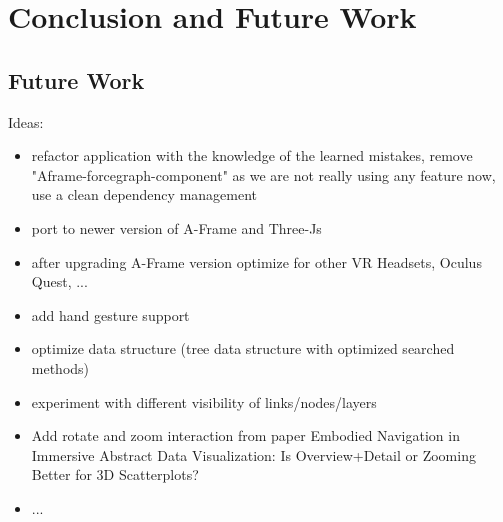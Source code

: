 \chapter{Conclusion and Future Work}

\section{Future Work}
Ideas:
\begin{itemize}
    \item refactor application with the knowledge of the learned mistakes, remove "Aframe-forcegraph-component" as we are not really using any feature now, use a clean dependency management
    \item port to newer version of A-Frame and Three-Js
    \item after upgrading A-Frame version optimize for other VR Headsets, Oculus Quest, ... 
    \item add hand gesture support
    \item optimize data structure (tree data structure  with optimized searched methods)
    \item experiment with different visibility of links/nodes/layers
    \item Add rotate and zoom interaction from paper Embodied Navigation in Immersive Abstract Data Visualization:
    Is Overview+Detail or Zooming Better for 3D Scatterplots?
    \item ...
\end{itemize}